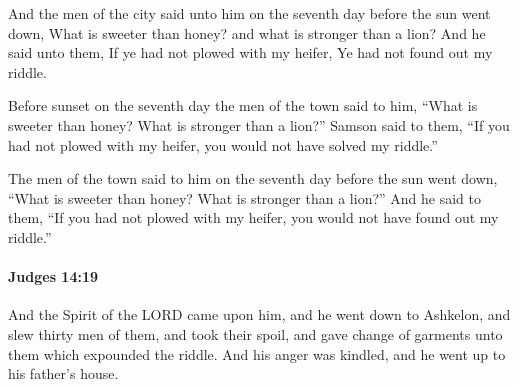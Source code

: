 			\begin{versebox}
					\item[BHS] 
					\item[ASV] And the men of the city said unto him on the seventh day before the sun went down, What is sweeter than honey? and what is stronger than a lion? And he said unto them, If ye had not plowed with my heifer, Ye had not found out my riddle.
					\item[NIV] Before sunset on the seventh day the men of the town said to him, “What is sweeter than honey? What is stronger than a lion?” Samson said to them, “If you had not plowed with my heifer, you would not have solved my riddle.”
					\item[NRSV] The men of the town said to him on the seventh day before the sun went down, “What is sweeter than honey? What is stronger than a lion?” And he said to them, “If you had not plowed with my heifer, you would not have found out my riddle.”
			\end{versebox}

		\paragraph{Judges 14:19} %
			\label{JUDGES-14-19}

			And the Spirit of the LORD came upon him, and he went down to Ashkelon, and slew thirty men of them, and took their spoil, and gave change of garments unto them which expounded the riddle. And his anger was kindled, and he went up to his father’s house.

